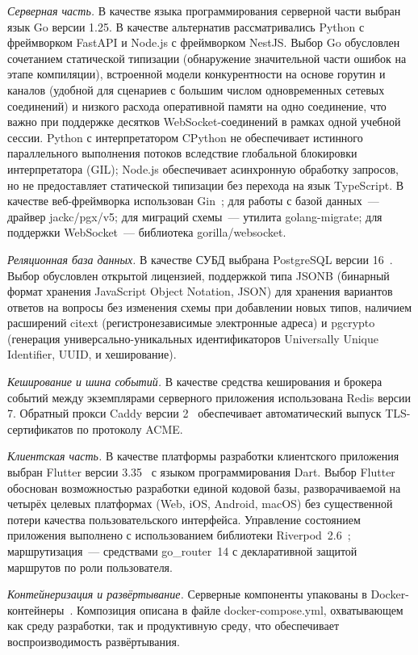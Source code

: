 \emph{Серверная часть.} В качестве языка программирования серверной
части выбран язык Go версии 1.25. В качестве альтернатив
рассматривались Python с фреймворком FastAPI и Node.js
с фреймворком NestJS. Выбор Go обусловлен сочетанием статической
типизации (обнаружение значительной части ошибок на этапе
компиляции), встроенной модели конкурентности на основе горутин
и каналов (удобной для сценариев с большим числом одновременных
сетевых соединений) и низкого расхода оперативной памяти на одно
соединение, что важно при поддержке десятков WebSocket-соединений
в рамках одной учебной сессии. Python с интерпретатором CPython
не обеспечивает истинного параллельного выполнения потоков
вследствие глобальной блокировки интерпретатора (GIL); Node.js
обеспечивает асинхронную обработку запросов, но не предоставляет
статической типизации без перехода на язык TypeScript.
В качестве веб-фреймворка использован Gin~\cite{gin_docs}; для
работы с базой данных~--- драйвер jackc/pgx/v5; для миграций
схемы~--- утилита golang-migrate; для поддержки WebSocket~---
библиотека gorilla/websocket.

\emph{Реляционная база данных.} В качестве СУБД выбрана
PostgreSQL версии 16~\cite{postgresql_docs}. Выбор обусловлен
открытой лицензией, поддержкой типа JSONB (бинарный формат
хранения JavaScript Object Notation, JSON) для хранения вариантов
ответов на вопросы без изменения схемы при добавлении новых типов,
наличием расширений citext (регистронезависимые электронные
адреса) и pgcrypto (генерация универсально-уникальных идентификаторов
Universally Unique Identifier, UUID, и хеширование).

\emph{Кеширование и шина событий.} В качестве средства кеширования
и брокера событий между экземплярами серверного приложения
использована Redis версии 7. Обратный прокси Caddy
версии 2~\cite{caddy_docs} обеспечивает автоматический выпуск
TLS-сертификатов по протоколу ACME.

\emph{Клиентская часть.} В качестве платформы разработки
клиентского приложения выбран Flutter версии 3.35~\cite{flutter_docs}
с языком программирования Dart. Выбор Flutter обоснован
возможностью разработки единой кодовой базы, разворачиваемой
на четырёх целевых платформах (Web, iOS, Android, macOS) без
существенной потери качества пользовательского интерфейса.
Управление состоянием приложения выполнено с использованием
библиотеки Riverpod~2.6~\cite{riverpod_docs}; маршрутизация~---
средствами go\_router~14 с декларативной защитой маршрутов
по роли пользователя.

\emph{Контейнеризация и развёртывание.} Серверные компоненты
упакованы в Docker-контейнеры~\cite{docker_docs}. Композиция
описана в файле docker-compose.yml, охватывающем
как среду разработки, так и продуктивную среду, что обеспечивает
воспроизводимость развёртывания.

